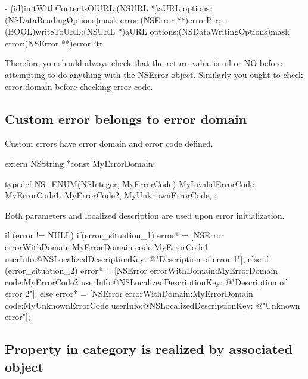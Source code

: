 \documentclass[10pt]{extarticle}
\newenvironment{codelisting}
{\footnotesize\mdframed[middlelinewidth=0.5pt, middlelinecolor=BaliHaiColor, skipabove=15pt]\verbatim}
{\endverbatim\endmdframed\vspace{12pt}\normalsize}
\begin{document}
\begin{codelisting}
- (id)initWithContentsOfURL:(NSURL *)aURL options:(NSDataReadingOptions)mask error:(NSError **)errorPtr;
- (BOOL)writeToURL:(NSURL *)aURL options:(NSDataWritingOptions)mask error:(NSError **)errorPtr
\end{codelisting}

Therefore you should always check that the return value is nil or NO before attempting to do anything with the NSError object. Similarly you ought to check error domain before checking error code.


\subsection{Custom error belongs to error domain}

Custom errors have error domain and error code defined.

\begin{codelisting}
extern NSString *const MyErrorDomain;

typedef NS_ENUM(NSInteger, MyErrorCode) {
    MyInvalidErrorCode
    MyErrorCode1,
    MyErrorCode2,
    MyUnknownErrorCode,
};
\end{codelisting}

Both parameters and localized description are used upon error initialization.

\begin{codelisting}
if (error != NULL) {
    if(error_situation_1) {
        error* = [NSError errorWithDomain:MyErrorDomain 
                                     code:MyErrorCode1
                                 userInfo:@{NSLocalizedDescriptionKey: @"Description of error 1"}];
    }
    else if (error_situation_2) {
        error* = [NSError errorWithDomain:MyErrorDomain 
                                     code:MyErrorCode2
                                 userInfo:@{NSLocalizedDescriptionKey: @"Description of error 2"}];
    }
    else {
        error* = [NSError errorWithDomain:MyErrorDomain 
                                     code:MyUnknownErrorCode
                                 userInfo:@{NSLocalizedDescriptionKey: @"Unknown error"}];
    }
}

\end{codelisting}


\subsection{Property in category is realized by associated object}
\end{document}
